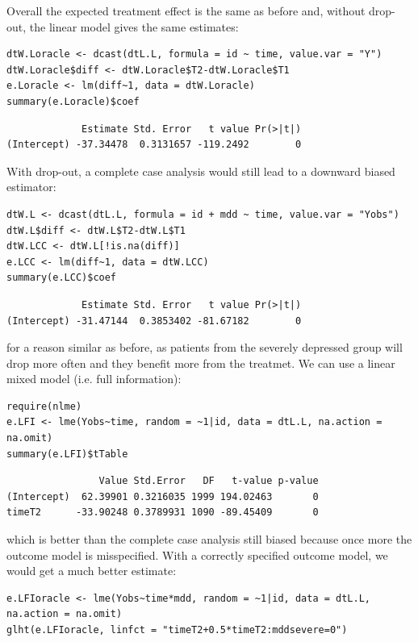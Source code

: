 \documentclass[12pt]{article}
\begin{document}
Overall the expected treatment effect is the same as before and,
without drop-out, the linear model gives the same estimates:
\lstset{language=r,label= ,caption= ,captionpos=b,numbers=none}
\begin{lstlisting}
dtW.Loracle <- dcast(dtL.L, formula = id ~ time, value.var = "Y")
dtW.Loracle$diff <- dtW.Loracle$T2-dtW.Loracle$T1
e.Loracle <- lm(diff~1, data = dtW.Loracle)
summary(e.Loracle)$coef
\end{lstlisting}

\begin{verbatim}
             Estimate Std. Error   t value Pr(>|t|)
(Intercept) -37.34478  0.3131657 -119.2492        0
\end{verbatim}


\clearpage

With drop-out, a complete case analysis would still lead to a downward
biased estimator:
\lstset{language=r,label= ,caption= ,captionpos=b,numbers=none}
\begin{lstlisting}
dtW.L <- dcast(dtL.L, formula = id + mdd ~ time, value.var = "Yobs")
dtW.L$diff <- dtW.L$T2-dtW.L$T1
dtW.LCC <- dtW.L[!is.na(diff)]
e.LCC <- lm(diff~1, data = dtW.LCC)
summary(e.LCC)$coef
\end{lstlisting}

\begin{verbatim}
             Estimate Std. Error   t value Pr(>|t|)
(Intercept) -31.47144  0.3853402 -81.67182        0
\end{verbatim}


for a reason similar as before, as patients from the severely
depressed group will drop more often and they benefit more from the
treatmet. We can use a linear mixed model (i.e. full information):
\lstset{language=r,label= ,caption= ,captionpos=b,numbers=none}
\begin{lstlisting}
require(nlme)
e.LFI <- lme(Yobs~time, random = ~1|id, data = dtL.L, na.action = na.omit)
summary(e.LFI)$tTable
\end{lstlisting}

\begin{verbatim}
                Value Std.Error   DF   t-value p-value
(Intercept)  62.39901 0.3216035 1999 194.02463       0
timeT2      -33.90248 0.3789931 1090 -89.45409       0
\end{verbatim}

which is better than the complete case analysis still biased because
once more the outcome model is misspecified. With a correctly
specified outcome model, we would get a much better estimate:
\lstset{language=r,label= ,caption= ,captionpos=b,numbers=none}
\begin{lstlisting}
e.LFIoracle <- lme(Yobs~time*mdd, random = ~1|id, data = dtL.L, na.action = na.omit)
glht(e.LFIoracle, linfct = "timeT2+0.5*timeT2:mddsevere=0")

\end{lstlisting}
\end{document}
